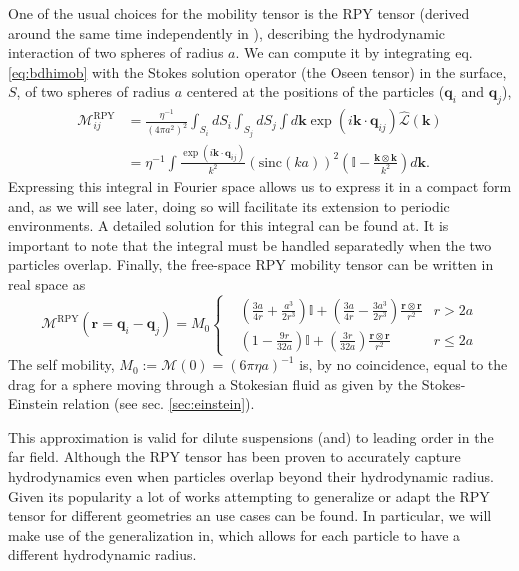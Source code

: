 \documentclass[ twoside,openright,titlepage,numbers=noenddot,%
headinclude,footinclude,cleardoublepage=empty,abstract=on,
BCOR=5mm,paper=a4,fontsize=11pt, dvipsnames
]{scrreprt}
\renewcommand{\vec}[1]{\bm{#1}}
\newcommand{\tens}[1]{\bm{\mathcal{#1}}}
\newcommand{\oper}[1]{\mathcal{#1}}
\newcommand{\sinc}{\textrm{sinc}}
\newcommand{\ppos}{q}
\begin{document}
One of the usual choices for the mobility tensor is the \gls{RPY} tensor (derived around the same time independently in \cite{Rotne1969,Yamakawa1970}), describing the hydrodynamic interaction of two spheres of radius $a$. We can compute it by integrating eq. \eqref{eq:bdhimob} with the Stokes solution operator (the Oseen tensor) in the surface, $S$, of two spheres of radius $a$ centered at the positions of the particles ($\vec{\ppos}_i$ and $\vec{\ppos}_j$),
\begin{equation}
  \label{eq:rpymobfour}
  \begin{aligned}
    \tens{M}_{ij}^{\textrm{RPY}} &= \frac{\eta^{-1}}{(4\pi a^2)^2} \int_{S_i}dS_i\int_{S_j}dS_j \int d\vec{k} \exp(i\vec{k}\cdot\vec{\ppos}_{ij})\hat{\oper{L}}(\vec{k})\\
    &= \eta^{-1} \int \frac{\exp(i\vec{k}\cdot\vec{\ppos}_{ij})}{k^2}\left(\sinc(ka) \right)^2\left(\mathbb{I} - \frac{\vec{k}\otimes\vec{k}}{k^2}\right)d\vec{k}.
\end{aligned}
\end{equation}
Expressing this integral in Fourier space allows us to express it in a compact form and, as we will see later, doing so will facilitate its extension to periodic environments.
A detailed solution for this integral can be found at\cite{Wajnryb2013}. It is important to note that the integral must be handled separatedly when the two particles overlap.
Finally, the free-space \gls{RPY} mobility tensor can be written in real space as\cite{Wajnryb2013}
\begin{equation}
  \label{eq:rpy}
  \tens{M}^{\textrm{RPY}}(\vec{r} = \vec{q}_i-\vec{q}_j) = M_0\left\{
  \begin{aligned}
    &\left( \frac{3a}{4r} + \frac{a^3}{2r^3} \right)\mathbb{I} + \left(\frac{3a}{4r} - \frac{3a^3}{2r^3}\right)\frac{\vec{r}\otimes\vec{r}}{r^2}  & r > 2a\\
    &\left(1 - \frac{9r}{32a} \right)\mathbb{I} + \left( \frac{3r}{32a} \right)\frac{\vec{r}\otimes\vec{r}}{r^2} & r \le 2a
  \end{aligned}\right.
\end{equation}
The self mobility, $M_0 := \tens{M}(0) = (6\pi\eta a)^{-1}$ is, by no coincidence, equal to the drag for a sphere moving through a Stokesian fluid as given by the Stokes-Einstein relation\cite{Dhont1996} (see sec. \ref{sec:einstein}).

This approximation is valid for dilute suspensions (and) to leading order in the far field. Although the \gls{RPY} tensor has been proven to accurately capture hydrodynamics even when particles overlap beyond their hydrodynamic radius\cite{Ermak1978}\cite{Wajnryb2013}.
Given its popularity a lot of works attempting to generalize or adapt the \gls{RPY} tensor for different geometries an use cases can be found\cite{Wajnryb2013,Liang2013,Guan2018,Fiore2017}. In particular, we will make use of the generalization in\cite{Zuk2014}, which allows for each particle to have a different hydrodynamic radius.
\end{document}

